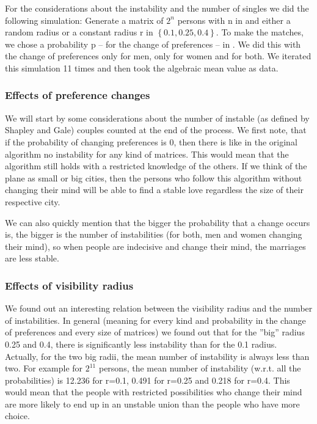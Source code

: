 \documentclass[11pt]{article}
\begin{document}
For the considerations about the instability and the number of singles we did the following 
simulation: Generate a matrix of $2^{n}$ persons with n in  and either a random radius or a constant radius 
r in $\left\{ {0.1, 0.25, 0.4}\right\}$. To make the matches, we chose a probability p -- for the change of preferences -- in 
. We did this with the change of preferences only for men, only for women and 
for both. We iterated this simulation 11 times and then took the algebraic mean value as data.

\subsubsection{Effects of preference changes}
We will start by some considerations about the number of instable (as defined by Shapley and Gale) 
couples counted at the end of the process.
We first note, that if the probability of changing preferences is 0, then there is like in the original 
algorithm no instability for any kind of matrices. This would mean that the algorithm still holds with a 
restricted knowledge of the others. If we think of the plane as small or big cities, then the persons 
who follow this algorithm without changing their mind will be able to find a stable love regardless the 
size of their respective city.

We can also quickly mention that the bigger the probability that a change occurs is, the bigger is the 
number of instabilities (for both, men and women changing their mind), so when people are indecisive 
and change their mind, the marriages are less stable.

\subsubsection{Effects of visibility radius}
We found out an interesting relation between the visibility radius and the number of instabilities. In 
general (meaning for every kind and probability in the change of preferences and every size of 
matrices) we found out that for the ''big'' radius 0.25 and 0.4, there is significantly less instability than 
for the 0.1 radius. Actually, for the two big radii, the mean number of instability is always less than 
two. For example for $2^{11}$ persons, the mean number of instability (w.r.t. all the probabilities) is 
12.236 for r=0.1, 0.491 for r=0.25 and 0.218 for r=0.4. This would mean that the people with 
restricted possibilities who change their mind are more likely to end up in an unstable union than the 
people who have more choice.
\end{document}
